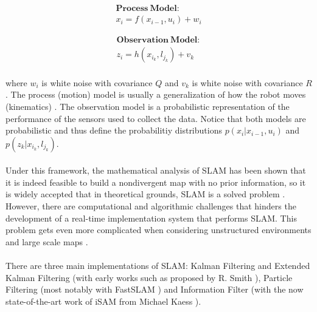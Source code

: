 \documentclass[11pt]{article}
\begin{document}
	\begin{minipage}{.5\linewidth}
		\centering
		\begin{equation*}
		\begin{split}
		\mathbf{Process\ Model:} \\ 
		x_i = f(x_{i-1}, u_i) + w_i
		\end{split}
		\end{equation*}
	\end{minipage}
	\begin{minipage}{.5\linewidth}
		\centering
		\begin{equation*}
		\begin{split}
		\mathbf{Observation\ Model:} \\ 
		z_i = h(x_{i_k}, l_{j_k}) + v_k
		\end{split}
		\end{equation*}
	\end{minipage}
	
	\paragraph{}
	where $w_i$ is white noise with covariance $Q$ and $v_k$ is white noise with covariance $R$. The process (motion) model is usually a generalization of how the robot moves (kinematics) \cite{Montemerlo02fastslam:a}\cite{772544}. The observation model is a probabilistic representation of the performance of the sensors used to collect the data. Notice that both models are probabilistic and thus define the probabilitiy distributions $p(x_i|x_{i-1},u_i)$ and $p(z_k|x_{i_k},l_{j_k})$.

	\paragraph{}
	Under this framework, the mathematical analysis of SLAM has been shown that it is indeed feasible to build a nondivergent map with no prior information, so it is widely accepted that in theoretical grounds, SLAM is a solved problem \cite{SLAMPartI}\cite{Cadena}\cite{CsorbaThesis}\cite{938381}. However, there are computational and algorithmic challenges that hinders the development of a real-time implementation system that performs SLAM. This problem gets even more complicated when considering unstructured environments and large scale maps \cite{SLAMPartII}.
	
	\paragraph{}
	There are three main implementations of SLAM: Kalman Filtering and Extended Kalman Filtering (with early works such as proposed by R. Smith \cite{Smith:1990:EUS:93002.93291}), Particle Filtering (most notably with FastSLAM \cite{Montemerlo02fastslam:a}) and Information Filter (with the now state-of-the-art work of iSAM from Michael Kaess \cite{Kaess08tro}).
\end{document}
